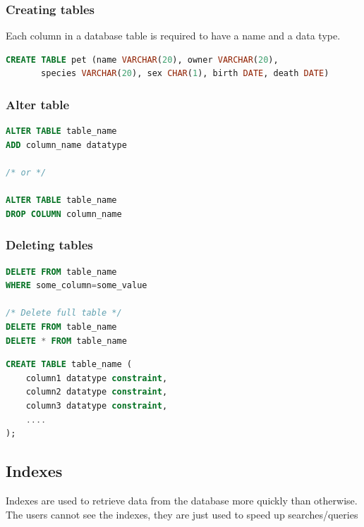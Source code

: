 \documentclass{article}
\begin{document}
\subsubsection{Creating tables}
Each column in a database table is required to have a name and a data type.

\vspace{8pt} \begin{lstlisting}[language=SQL]
CREATE TABLE pet (name VARCHAR(20), owner VARCHAR(20),
       species VARCHAR(20), sex CHAR(1), birth DATE, death DATE)
\end{lstlisting} \vspace{8pt}

\subsubsection{Alter table}

\vspace{8pt} \begin{lstlisting}[language=SQL]
ALTER TABLE table_name
ADD column_name datatype

/* or */

ALTER TABLE table_name
DROP COLUMN column_name
\end{lstlisting} \vspace{8pt}

\subsubsection{Deleting tables}

\vspace{8pt} \begin{lstlisting}[language=SQL]
DELETE FROM table_name
WHERE some_column=some_value

/* Delete full table */
DELETE FROM table_name
DELETE * FROM table_name
\end{lstlisting} \vspace{8pt}



\vspace{8pt} \begin{lstlisting}[language=SQL]
CREATE TABLE table_name (
    column1 datatype constraint,
    column2 datatype constraint,
    column3 datatype constraint,
    ....
);
\end{lstlisting} \vspace{8pt}


\subsection{Indexes}
Indexes are used to retrieve data from the database more quickly than otherwise. The users cannot see the indexes, they are just used to speed up searches/queries
\end{document}
